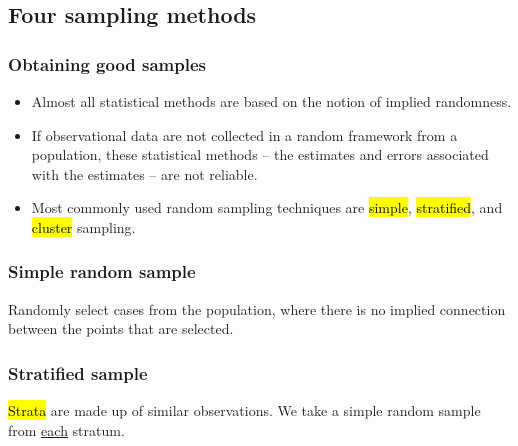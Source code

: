 \documentclass[slidestop,compress,mathserif]{beamer}
\begin{document}

\subsection{Four sampling methods}


\begin{frame}
\frametitle{Obtaining good samples}

\begin{itemize}

\item Almost all statistical methods are based on the notion of implied randomness. 

\item If observational data are not collected in a random framework from a population, these statistical methods -- the estimates and errors associated with the estimates -- are not reliable.

\item Most commonly used random sampling techniques are \hl{simple}, \hl{stratified}, and \hl{cluster} sampling.

\end{itemize}

\end{frame}


\begin{frame}
\frametitle{Simple random sample}

Randomly select cases from the population, where there is no implied connection between the points that are selected.

\begin{center}
\end{center}

\end{frame}


\begin{frame}
\frametitle{Stratified sample}

\hl{Strata} are made up of similar observations. We take a simple random sample from \underline{each} stratum.

\begin{center}
\end{center}

\end{frame}
\end{document}
